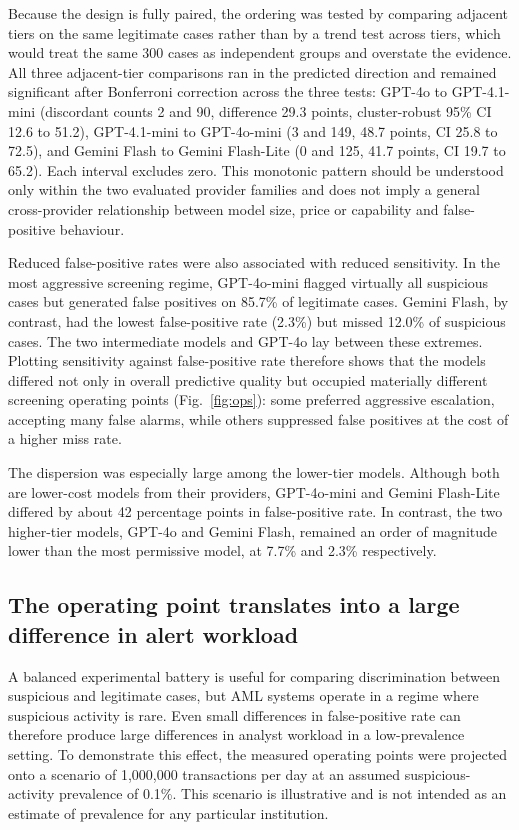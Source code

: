 \documentclass[pdflatex,sn-basic,Numbered]{sn-jnl}
\begin{document}
Because the design is fully paired, the ordering was tested by comparing adjacent tiers on the same legitimate cases rather than by a trend test across tiers, which would treat the same 300 cases as independent groups and overstate the evidence. All three adjacent-tier comparisons ran in the predicted direction and remained significant after Bonferroni correction across the three tests: GPT-4o to GPT-4.1-mini (discordant counts 2 and 90, difference 29.3 points, cluster-robust 95\% CI 12.6 to 51.2), GPT-4.1-mini to GPT-4o-mini (3 and 149, 48.7 points, CI 25.8 to 72.5), and Gemini Flash to Gemini Flash-Lite (0 and 125, 41.7 points, CI 19.7 to 65.2). Each interval excludes zero. This monotonic pattern should be understood only within the two evaluated provider families and does not imply a general cross-provider relationship between model size, price or capability and false-positive behaviour.

Reduced false-positive rates were also associated with reduced sensitivity. In the most aggressive screening regime, GPT-4o-mini flagged virtually all suspicious cases but generated false positives on 85.7\% of legitimate cases. Gemini Flash, by contrast, had the lowest false-positive rate (2.3\%) but missed 12.0\% of suspicious cases. The two intermediate models and GPT-4o lay between these extremes. Plotting sensitivity against false-positive rate therefore shows that the models differed not only in overall predictive quality but occupied materially different screening operating points (Fig.~\ref{fig:ops}): some preferred aggressive escalation, accepting many false alarms, while others suppressed false positives at the cost of a higher miss rate.

The dispersion was especially large among the lower-tier models. Although both are lower-cost models from their providers, GPT-4o-mini and Gemini Flash-Lite differed by about 42 percentage points in false-positive rate. In contrast, the two higher-tier models, GPT-4o and Gemini Flash, remained an order of magnitude lower than the most permissive model, at 7.7\% and 2.3\% respectively.

\subsection{The operating point translates into a large difference in alert workload}\label{sec:volume}

A balanced experimental battery is useful for comparing discrimination between suspicious and legitimate cases, but AML systems operate in a regime where suspicious activity is rare. Even small differences in false-positive rate can therefore produce large differences in analyst workload in a low-prevalence setting. To demonstrate this effect, the measured operating points were projected onto a scenario of 1,000,000 transactions per day at an assumed suspicious-activity prevalence of 0.1\%. This scenario is illustrative and is not intended as an estimate of prevalence for any particular institution.
\end{document}
